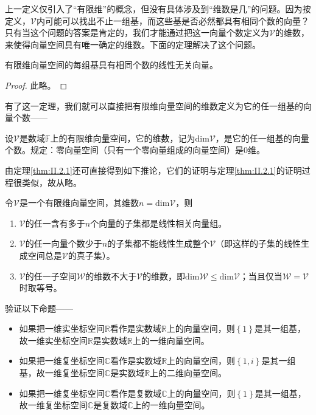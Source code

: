 \documentclass[main.tex]{subfiles}
\begin{document}
上一定义仅引入了“有限维”的概念，但没有具体涉及到“维数是几”的问题。因为按定义，$\mathcal{V}$内可能可以找出不止一组基，而这些基是否必然都具有相同个数的向量？只有当这个问题的答案是肯定的，我们才能通过把这一向量个数定义为$\mathcal{V}$的维数，来使得向量空间具有唯一确定的维数。下面的定理解决了这个问题。

\begin{theorem}\label{thm:II.2.1}
有限维向量空间的每组基具有相同个数的线性无关向量。
\end{theorem}
\begin{proof}
此略\cite[“(3)的证明”，p.~171]{周胜林2012线性代数}\cite[\S 2.3,Theorem 4,p.~44]{Hoffman1971}。
\end{proof}

有了这一定理，我们就可以直接把有限维向量空间的维数定义为它的任一组基的向量个数——

\begin{definition}\label{def:II.2.6}
设$\mathcal{V}$是数域$\mathbb{F}$上的有限维向量空间，它的维数，记为$\mathrm{dim}\mathcal{V}$，是它的任一组基的向量个数。规定：零向量空间（只有一个零向量组成的向量空间）是0维。
\end{definition}

由定理\ref{thm:II.2.1}还可直接得到如下推论，它们的证明与定理\ref{thm:II.2.1}的证明过程很类似，故从略。

\begin{corollary}
令$\mathcal{V}$是一个有限维向量空间，其维数$n=\mathrm{dim}\mathcal{V}$，则
\begin{enumerate}
    \item $\mathcal{V}$的任一含有多于$n$个向量的子集都是线性相关向量组\cite[“(3)的证明”，p.~171]{周胜林2012线性代数}。
    \item $\mathcal{V}$的任一向量个数少于$n$的子集都不能线性生成整个$\mathcal{V}$（即这样的子集的线性生成空间总是$\mathcal{V}$的真子集）。
    \item $\mathcal{V}$的任一子空间$\mathcal{W}$的维数不大于$\mathcal{V}$的维数，即$\mathrm{dim}\mathcal{W}\leq\mathrm{dim}\mathcal{V}$；当且仅当$\mathcal{W}=\mathcal{V}$时取等号。
\end{enumerate}
\end{corollary}

\begin{example}
验证以下命题——
\begin{itemize}
    \item 如果把一维实坐标空间$\mathbb{R}$看作是实数域$\mathbb{R}$上的向量空间，则$\left\{1\right\}$是其一组基，故一维实坐标空间$\mathbb{R}$是实数域$\mathbb{R}$上的一维向量空间。
    \item 如果把一维复坐标空间$\mathbb{C}$看作是实数域$\mathbb{R}$上的向量空间，则$\left\{1,i\right\}$是其一组基，故一维复坐标空间$\mathbb{C}$是实数域$\mathbb{R}$上的二维向量空间。
    \item 如果把一维复坐标空间$\mathbb{C}$看作是复数域$\mathbb{C}$上的向量空间，则$\left\{1\right\}$是其一组基，故一维复坐标空间$\mathbb{C}$是复数域$\mathbb{C}$上的一维向量空间。
\end{itemize}
\end{example}
\end{document}

